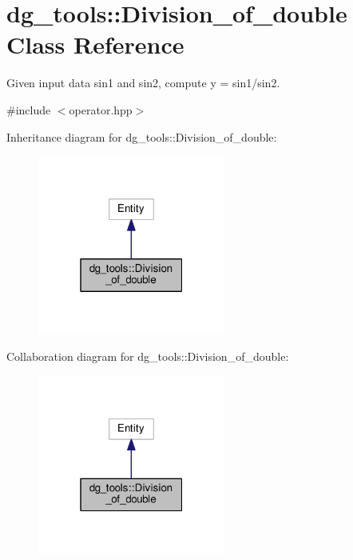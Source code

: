 \hypertarget{classdg__tools_1_1Division__of__double}{}\section{dg\+\_\+tools\+:\+:Division\+\_\+of\+\_\+double Class Reference}
\label{classdg__tools_1_1Division__of__double}


Given input data sin1 and sin2, compute y = sin1/sin2.  




{\ttfamily \#include $<$operator.\+hpp$>$}



Inheritance diagram for dg\+\_\+tools\+:\+:Division\+\_\+of\+\_\+double\+:
\nopagebreak
\begin{figure}[H]
\begin{center}
\leavevmode
\includegraphics[width=175pt]{classdg__tools_1_1Division__of__double__inherit__graph}
\end{center}
\end{figure}


Collaboration diagram for dg\+\_\+tools\+:\+:Division\+\_\+of\+\_\+double\+:
\nopagebreak
\begin{figure}[H]
\begin{center}
\leavevmode
\includegraphics[width=175pt]{classdg__tools_1_1Division__of__double__coll__graph}
\end{center}
\end{figure}
